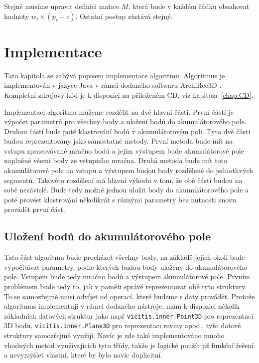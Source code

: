 \documentclass[11pt,twoside,a4paper]{book}
\begin{document}
Stejně musíme upravit definici matice $M$, která bude v každém řádku obsahovat hodnoty $w_i \times (p_i - c)$. Ostatní postup zůstává stejný.

\chapter{Implementace}
\label{chap:implementace}

Tato kapitola se zabývá popisem implementace algoritmu. Algoritmus je implementován v jazyce Java v rámci dodaného softwaru ArchiRec3D \cite{AR3D}. Kompletní zdrojový kód je k dispozici na přiloženém CD, viz kapitola~\ref{chap:CD}.


Implementaci algoritmu můžeme rozdělit na dvě hlavní části. První částí je výpočet parametrů pro všechny body a uložení bodů do akumulátorového pole. Druhou částí bude poté klastrování bodů v akumulátorovém poli. Tyto dvě části budou reprezentovány jako samostatné metody. První metoda bude mít na vstupu zpracovávané mračno bodů a jejím výstupem bude akumulátorové pole naplněné všemi body ze vstupního mračna. Druhá metoda bude mít toto akumulátorové pole na vstupu a výstupem budou body rozdělené do jednotlivých segmentů. Takovéto rozdělení má hlavní výhodu v tom, že obě části budou na sobě nezávislé. Bude tedy možné jednou uložit body do akumulátorového pole a poté provést klastrování několikrát s různými parametry bez nutnosti znovu provádět první část.

\section{Uložení bodů do akumulátorového pole}

Tato část algoritmu bude procházet všechny body, na základě jejich okolí bude vy\-po\-čí\-tá\-vat parametry, podle kterých budou body uloženy do akumulátorového pole. Vstupem bude tedy mračno bodů a výstupem akumulátorové pole. Prvním problémem bude tedy to, jak v paměti správě reprezentovat obě tyto struktury. To se samozřejmě musí odvíjet od operací, které budeme s daty provádět. Protože algoritmus implementuji v rámci dodaného nástroje, mám k dispozici několik základních datových struktur jako např \verb|vicitis.inner.Point3D| pro reprezentaci 3D bodu, \verb|vicitis.inner.Plane3D| pro reprezentaci roviny apod., tyto datové struktury samozřejmě využiji. Navíc je zde také implementováno mnoho vhodných metod využívajících tyto třídy, takže je logické použít již funkční řešení a nevymýšlet vlastní, které by bylo navíc duplicitní.
\end{document}
